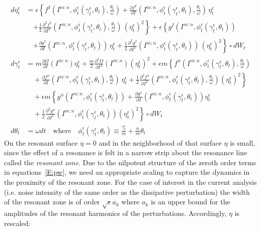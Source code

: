 \begin{equation}
\begin{aligned}
d {\eta}_t^\epsilon &= \epsilon \left\{
f^I(I^{m:n},\phi_t^\epsilon(\gamma_t^\epsilon,\theta_t),\frac{\theta_t}{\omega}) + \frac{\partial f^I}{\partial I}(I^{m:n},\phi_t^\epsilon(\gamma_t^\epsilon,\theta_t),\frac{\theta_t}{\omega}) \, {\eta}_t^\epsilon \right.\\
&\quad \left. + \frac12 \frac{\partial ^2 f^I}{\partial I ^2}(I^{m:n},\phi_t^\epsilon(\gamma_t^\epsilon,\theta_t),\frac{\theta_t}{\omega}) \, ({\eta}_t^\epsilon)^2 \right\} + \epsilon \left\{g^I(I^{m:n}, \phi_t^\epsilon(\gamma_t^\epsilon, \theta_t)) \right.\\
&\quad \left. + \frac{\partial g^I}{\partial
I}(I^{m:n},\phi_t^\epsilon(\gamma_t^\epsilon,\theta_t)) \,
{\eta}_t^\epsilon + \frac12 \frac{\partial^2 g^I}{\partial I^2}(I^{m:n},\phi_t^\epsilon(\gamma_t^\epsilon,\theta_t)) \, ({\eta}_t^\epsilon)^2\right\} \circ dW_t\\
d {\gamma}_t^\epsilon &= m \frac{\partial \Omega}{\partial I}
(I^{m:n}) {\eta}_t^\epsilon +\frac{m}{2}\frac{\partial
^2\Omega}{\partial I^2} (I^{m:n}) ({\eta}_t^\epsilon)^2
 + \epsilon  m \left\{ f^{\phi}(I^{m:n},\phi_t^\epsilon(\gamma_t^\epsilon,\theta_t),\frac{\theta_t}{\omega}) \right.\\
&\quad + \left.\frac{\partial f^{\phi}}{\partial
I}(I^{m:n},\phi_t^\epsilon(\gamma_t^\epsilon,\theta_t),\frac{\theta_t}{\omega})
\, {\eta}_t^\epsilon+ \frac12 \frac{\partial^2 f^{\phi}}{\partial
I^2}(I^{m:n},\phi_t^\epsilon(\gamma_t^\epsilon,\theta_t),\frac{\theta_t}{\omega})
({\eta}_t^\epsilon)^2\right\}\\
&\quad + \epsilon m \left\{g^{\phi}(I^{m:n},\phi_t^\epsilon(\gamma_t^\epsilon,\theta_t))
+ \frac{\partial g^{\phi}}{\partial
I}(I^{m:n},\phi_t^\epsilon(\gamma_t^\epsilon,\theta_t)) \eta_t^\epsilon\right.\\
&\quad + \left.\frac12 \frac{\partial^2 g^{\phi}}{\partial I^2}(I^{m:n},\phi_t^\epsilon(\gamma_t^\epsilon,\theta_t)) ({\eta}_t^\epsilon)^2\right\} \circ dW_t\\
d {\theta}_t &= \omega d t \quad \text{where} \quad
\phi_t^\epsilon(\gamma_t^\epsilon,\theta_t)\equiv\frac{\gamma_t^\epsilon}{m}+\frac{n}{m}\theta_t
\end{aligned}
\label{E:pw}
\end{equation}
On the resonant surface $\eta=0$ and in the neighborhood of that surface $\eta$ is small, since the effect of a resonance is felt in a narrow strip about the resonance line called the \emph{resonant zone}. Due to the nilpotent structure of the zeroth order terms in equations~\eqref{E:pw}, we need an appropriate scaling to capture the dynamics in the proximity of the resonant zone. For the case of interest in the current analysis (i.e. noise intensity  of the same order as the dissipative perturbation) the width of the resonant zone is of order $\sqrt\epsilon a_k$ where $a_k$ is an upper bound for the amplitudes of the resonant harmonics of the perturbations. Accordingly, $\eta$ is rescaled:

